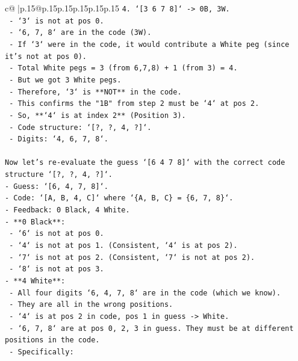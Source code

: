 \documentclass{article}
\begin{document}
{\begin{supertabular}{c@{$\;$}|p{.15\linewidth}@{}p{.15\linewidth}p{.15\linewidth}p{.15\linewidth}p{.15\linewidth}p{.15\linewidth}}
{{{\texttt{4.  `{[}3 6 7 8{]}` {-}> 0B, 3W.} \\
\texttt{    {-} `3` is not at pos 0.} \\
\texttt{    {-} `6, 7, 8` are in the code (3W).} \\
\texttt{    {-} If `3` were in the code, it would contribute a White peg (since it's not at pos 0).} \\
\texttt{    {-} Total White pegs = 3 (from 6,7,8) + 1 (from 3) = 4.} \\
\texttt{    {-} But we got 3 White pegs.} \\
\texttt{    {-} Therefore, `3` is **NOT** in the code.} \\
\texttt{    {-} This confirms the "1B" from step 2 must be `4` at pos 2.} \\
\texttt{    {-} So, **`4` is at index 2** (Position 3).} \\
\texttt{    {-} Code structure: `{[}?, ?, 4, ?{]}`.} \\
\texttt{    {-} Digits: `4, 6, 7, 8`.} \\
\\ 
\texttt{Now let's re{-}evaluate the guess `{[}6 4 7 8{]}` with the correct code structure `{[}?, ?, 4, ?{]}`.} \\
\texttt{{-} Guess: `{[}6, 4, 7, 8{]}`.} \\
\texttt{{-} Code: `{[}A, B, 4, C{]}` where `\{A, B, C\} = \{6, 7, 8\}`.} \\
\texttt{{-} Feedback: 0 Black, 4 White.} \\
\texttt{{-} **0 Black**:} \\
\texttt{    {-} `6` is not at pos 0.} \\
\texttt{    {-} `4` is not at pos 1. (Consistent, `4` is at pos 2).} \\
\texttt{    {-} `7` is not at pos 2. (Consistent, `7` is not at pos 2).} \\
\texttt{    {-} `8` is not at pos 3.} \\
\texttt{{-} **4 White**:} \\
\texttt{    {-} All four digits `6, 4, 7, 8` are in the code (which we know).} \\
\texttt{    {-} They are all in the wrong positions.} \\
\texttt{    {-} `4` is at pos 2 in code, pos 1 in guess {-}> White.} \\
\texttt{    {-} `6, 7, 8` are at pos 0, 2, 3 in guess. They must be at different positions in the code.} \\
\texttt{    {-} Specifically:} \\
}}}
\end{supertabular}}
\end{document}
